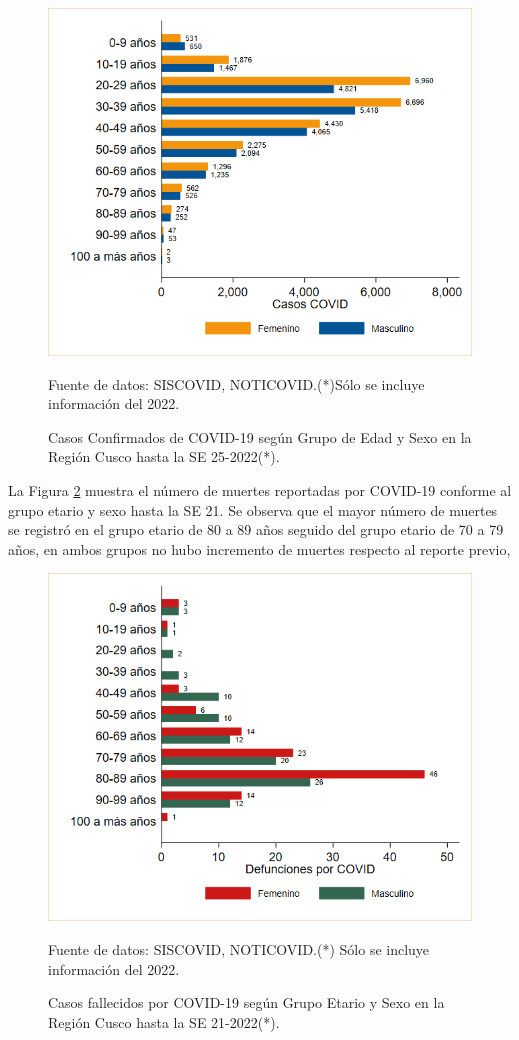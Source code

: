 \documentclass[12pt,a4paper,openany]{book}
\begin{document}
	
	\begin{figure}[h]
		\caption{Casos Confirmados de COVID-19 según Grupo de Edad y Sexo en la Región Cusco hasta la SE 25-2022(*).}\label{fig:casos_edad_sexo}
		\begin{center}
			\includegraphics[width=0.75\linewidth]{../figuras/casos_etapavida_2022}
		\end{center}
		{\footnotesize {Fuente de datos: SISCOVID, NOTICOVID.(*)Sólo se incluye información del 2022.}}
	\end{figure}
	\pagebreak
	
	
	La Figura \ref{fig:fallecidos_edad_sexo}  muestra el número de muertes reportadas por COVID-19 conforme al grupo etario y sexo hasta la SE 21. Se observa que el mayor número de muertes se registró en el grupo etario de 80 a 89 años seguido del grupo etario de 70 a 79 años, en ambos grupos no hubo incremento de muertes respecto al reporte previo, 
	
	\begin{figure}[h]
		\caption{Casos fallecidos por COVID-19 según Grupo Etario y Sexo en la Región Cusco hasta la SE 21-2022(*).}\label{fig:fallecidos_edad_sexo}
		\begin{center}
			\includegraphics[width=0.75\linewidth]{../figuras/defunciones_etapavida_2022}
		\end{center}
		{\footnotesize {Fuente de datos: SISCOVID, NOTICOVID.(*) Sólo se incluye información del 2022.}}
	\end{figure}
	
\end{document}

